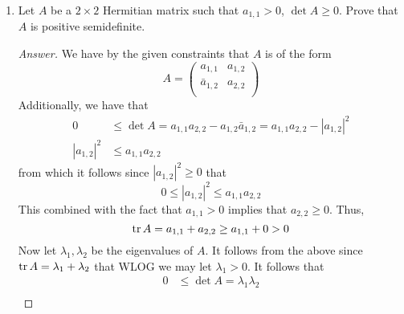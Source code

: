 \documentclass[../psets.tex]{subfiles}
\begin{document}
\begin{enumerate}[label={\textbf{4.\arabic*.}}]
\begin{enumerate}
\begin{proof}[Answer]
            By Theorem 7.4.1, $A$ is indefinite and $B$ is positive definite. However,
            \begin{equation*}
                A+B =
                \begin{pmatrix}
                    2 & 0\\
                    0 & 0\\
                \end{pmatrix}
            \end{equation*}
            which is positive semidefinite by Theorem 7.4.1.
        \end{proof}
    \end{enumerate}
    \item Let $A$ be a $2\times 2$ Hermitian matrix such that $a_{1,1}>0$, $\det A\geq 0$. Prove that $A$ is positive semidefinite.
    \begin{proof}[Answer]
        We have by the given constraints that $A$ is of the form
        \begin{equation*}
            A =
            \begin{pmatrix}
                a_{1,1} & a_{1,2}\\
                \bar{a}_{1,2} & a_{2,2}\\
            \end{pmatrix}
        \end{equation*}
        Additionally, we have that
        \begin{align*}
            0 &\leq \det A
            = a_{1,1}a_{2,2}-a_{1,2}\bar{a}_{1,2}
            = a_{1,1}a_{2,2}-|a_{1,2}|^2\\
            |a_{1,2}|^2 &\leq a_{1,1}a_{2,2}
        \end{align*}
        from which it follows since $|a_{1,2}|^2\geq 0$ that
        \begin{equation*}
            0 \leq |a_{1,2}|^2 \leq a_{1,1}a_{2,2}
        \end{equation*}
        This combined with the fact that $a_{1,1}>0$ implies that $a_{2,2}\geq 0$. Thus,
        \begin{equation*}
            \trace A = a_{1,1}+a_{2,2} \geq a_{1,1}+0 > 0
        \end{equation*}
        Now let $\lambda_1,\lambda_2$ be the eigenvalues of $A$. It follows from the above since $\trace A=\lambda_1+\lambda_2$ that WLOG we may let $\lambda_1>0$. It follows that
        \begin{align*}
            0 &\leq \det A = \lambda_1\lambda_2\\

\end{align*}
\end{proof}
\end{enumerate}
\end{document}
